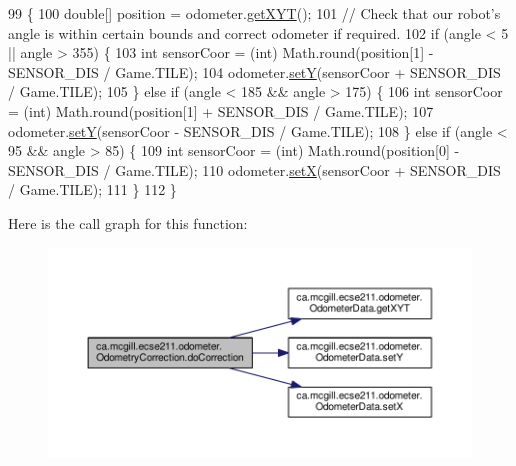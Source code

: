 \begin{DoxyCode}
99                                          \{
100     \textcolor{keywordtype}{double}[] position = odometer.\hyperlink{classca_1_1mcgill_1_1ecse211_1_1odometer_1_1_odometer_data_a8f40f0264c68f0cbed4fff1723ae7863}{getXYT}();
101     \textcolor{comment}{// Check that our robot's angle is within certain bounds and correct odometer if required.}
102     \textcolor{keywordflow}{if} (angle < 5 || angle > 355) \{
103       \textcolor{keywordtype}{int} sensorCoor = (int) Math.round(position[1] - SENSOR\_DIS / Game.TILE);
104       odometer.\hyperlink{classca_1_1mcgill_1_1ecse211_1_1odometer_1_1_odometer_data_a82986438cd462e66520bc62bb4bd2b75}{setY}(sensorCoor + SENSOR\_DIS / Game.TILE);
105     \} \textcolor{keywordflow}{else} \textcolor{keywordflow}{if} (angle < 185 && angle > 175) \{
106       \textcolor{keywordtype}{int} sensorCoor = (int) Math.round(position[1] + SENSOR\_DIS / Game.TILE);
107       odometer.\hyperlink{classca_1_1mcgill_1_1ecse211_1_1odometer_1_1_odometer_data_a82986438cd462e66520bc62bb4bd2b75}{setY}(sensorCoor - SENSOR\_DIS / Game.TILE);
108     \} \textcolor{keywordflow}{else} \textcolor{keywordflow}{if} (angle < 95 && angle > 85) \{
109       \textcolor{keywordtype}{int} sensorCoor = (int) Math.round(position[0] - SENSOR\_DIS / Game.TILE);
110       odometer.\hyperlink{classca_1_1mcgill_1_1ecse211_1_1odometer_1_1_odometer_data_a2911d7215e47f3064defe016b46bfeef}{setX}(sensorCoor + SENSOR\_DIS / Game.TILE);
111     \}
112   \}
\end{DoxyCode}
Here is the call graph for this function\+:\nopagebreak
\begin{figure}[H]
\begin{center}
\leavevmode
\includegraphics[width=350pt]{classca_1_1mcgill_1_1ecse211_1_1odometer_1_1_odometry_correction_a21a351682dc75060d6a5f15ad4775068_cgraph}
\end{center}
\end{figure}
\mbox{\label{classca_1_1mcgill_1_1ecse211_1_1odometer_1_1_odometry_correction_aad66a7030ac00f3a9cbe7bc33c25acbf}} 
